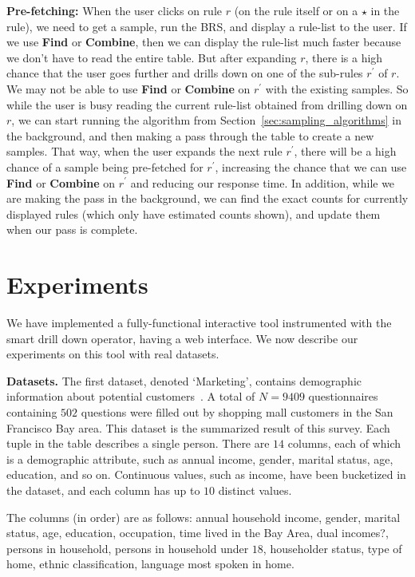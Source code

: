 \documentclass[10pt,journal,compsoc]{IEEEtran}
\newcommand{\stitle}[1]{\vspace{0.5em}\noindent\textbf{#1}}
\newcommand{\techreporttext}[1]{#1}
\begin{document}
\techreporttext{
\smallskip
\noindent \textbf{Pre-fetching:} When the user clicks on rule $r$ (on the rule itself or on a $\star$ in the rule), we need to get a sample, run the BRS, and display a rule-list to the user. If we use \textbf{Find} or \textbf{Combine}, then we can display the rule-list much faster because we don't have to read the entire table. But after expanding $r$, there is a high chance that the user goes further and drills down on one of the sub-rules $r^{\prime}$ of $r$. We may not be able to use \textbf{Find} or \textbf{Combine} on $r^{\prime}$ with the existing samples. So while the user is busy reading the current rule-list obtained from drilling down on $r$, we can start running the algorithm from Section~\ref{sec:sampling_algorithms} in the background, and then making a pass through the table to create a new samples. That way, when the user expands the next rule $r^{\prime}$, there will be a high chance of a sample being pre-fetched for $r^{\prime}$, increasing the chance that we can use \textbf{Find} or \textbf{Combine} on $r^{\prime}$ and reducing our response time.
In addition, while we are making the pass in the background, we can find the exact counts for currently displayed rules (which only have estimated counts shown), and update them when our pass is complete.
}

\section{Experiments}\label{sec:experiments}
We have implemented a fully-functional interactive tool instrumented with the smart drill down operator, having a web interface.
We now describe our experiments on this tool with real datasets.

\stitle{Datasets.} The first dataset, denoted `Marketing', contains demographic information about potential customers~\cite{dataset1}. A total of $N=9409$ questionnaires containing $502$ questions were filled out by shopping mall customers in the San Francisco Bay area. This dataset is the summarized result of this survey. Each tuple in the table describes a single person. There are $14$ columns, each of which is a demographic attribute, such as annual income, gender, marital status, age, education, and so on. Continuous values, such as income, have been bucketized in the dataset, and each column has up to $10$ distinct values.

The columns (in order) are as follows:
annual household income, gender, marital status, age, education, occupation, time lived in the Bay Area, dual incomes?, persons in household, persons in household under $18$, householder status, type of home, ethnic classification, language most spoken in home.
\end{document}
